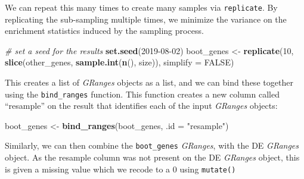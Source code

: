 \documentclass[
]{article}
\newenvironment{Shaded}{}{}
\newcommand{\CommentTok}[1]{\textcolor[rgb]{0.38,0.63,0.69}{\textit{#1}}}
\newcommand{\DataTypeTok}[1]{\textcolor[rgb]{0.56,0.13,0.00}{#1}}
\newcommand{\DecValTok}[1]{\textcolor[rgb]{0.25,0.63,0.44}{#1}}
\newcommand{\KeywordTok}[1]{\textcolor[rgb]{0.00,0.44,0.13}{\textbf{#1}}}
\newcommand{\NormalTok}[1]{#1}
\newcommand{\OperatorTok}[1]{\textcolor[rgb]{0.40,0.40,0.40}{#1}}
\newcommand{\OtherTok}[1]{\textcolor[rgb]{0.00,0.44,0.13}{#1}}
\newcommand{\StringTok}[1]{\textcolor[rgb]{0.25,0.44,0.63}{#1}}
\begin{document}
We can repeat this many times to create many samples via \texttt{replicate}. By
replicating the sub-sampling multiple times, we minimize the variance on the
enrichment statistics induced by the sampling process.

\begin{Shaded}
\begin{Highlighting}[]
\CommentTok{# set a seed for the results}
\KeywordTok{set.seed}\NormalTok{(}\DecValTok{2019-08-02}\NormalTok{)}
\NormalTok{boot_genes <-}\StringTok{ }\KeywordTok{replicate}\NormalTok{(}\DecValTok{10}\NormalTok{,}
                        \KeywordTok{slice}\NormalTok{(other_genes, }\KeywordTok{sample.int}\NormalTok{(}\KeywordTok{n}\NormalTok{(), size)),}
                        \DataTypeTok{simplify =} \OtherTok{FALSE}\NormalTok{)}
\end{Highlighting}
\end{Shaded}

This creates a list of \emph{GRanges} objects as a list, and we can bind these
together using the \texttt{bind\_ranges} function. This function creates a new column
called ``resample'' on the result that identifies each of the input \emph{GRanges}
objects:

\begin{Shaded}
\begin{Highlighting}[]
\NormalTok{boot_genes <-}\StringTok{ }\KeywordTok{bind_ranges}\NormalTok{(boot_genes, }\DataTypeTok{.id =} \StringTok{"resample"}\NormalTok{)}
\end{Highlighting}
\end{Shaded}

Similarly, we can then combine the \texttt{boot\_genes} \emph{GRanges}, with the DE
\emph{GRanges} object. As the resample column was not present on the DE \emph{GRanges}
object, this is given a missing value which we recode to a 0 using \texttt{mutate()}

\begin{Shaded}
\end{Shaded}
\end{document}
